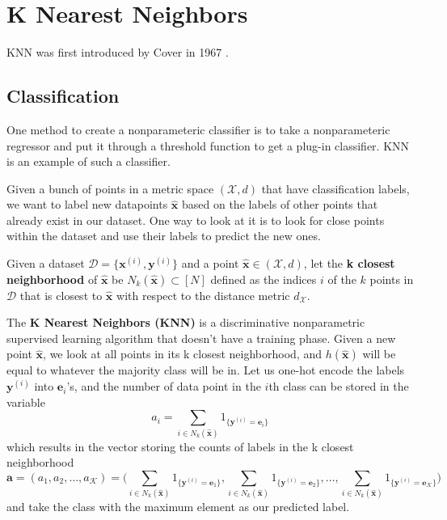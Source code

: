 \section{K Nearest Neighbors} 

  KNN was first introduced by Cover in 1967 \cite{1967cover}. 

\subsection{Classification} 

  One method to create a nonparameteric classifier is to take a nonparameteric regressor and put it through a threshold function to get a plug-in classifier. KNN is an example of such a classifier. 

  Given a bunch of points in a metric space $(\mathcal{X}, d)$ that have classification labels, we want to label new datapoints $\hat{\mathbf{x}}$ based on the labels of other points that already exist in our dataset. One way to look at it is to look for close points within the dataset and use their labels to predict the new ones. 

  \begin{definition}
    Given a dataset $\mathcal{D} = \{\mathbf{x}^{(i)}, \mathbf{y}^{(i)}\}$ and a point $\hat{\mathbf{x}} \in (\mathcal{X}, d)$, let the \textbf{k closest neighborhood} of $\hat{\mathbf{x}}$ be $N_k (\hat{\mathbf{x}}) \subset [N]$ defined as the indices $i$ of the $k$ points in $\mathcal{D}$ that is closest to $\hat{\mathbf{x}}$ with respect to the distance metric $d_\mathcal{X}$. 
  \end{definition}

  \begin{definition}
    The \textbf{K Nearest Neighbors (KNN)} is a discriminative nonparametric supervised learning algorithm that doesn't have a training phase. Given a new point $\hat{\mathbf{x}}$, we look at all points in its k closest neighborhood, and $h(\hat{\mathbf{x}})$ will be equal to whatever the majority class will be in. Let us one-hot encode the labels $\mathbf{y}^{(i)}$ into $\mathbf{e}_i$'s, and the number of data point in the $i$th class can be stored in the variable 
    \begin{equation}
      a_i = \sum_{i \in N_k (\hat{\mathbf{x}})} 1_{\{\mathbf{y}^{(i)} = \mathbf{e}_i\}}
    \end{equation}
    which results in the vector storing the counts of labels in the k closest neighborhood 
    \begin{equation}
      \mathbf{a} = (a_1, a_2, \ldots, a_\mathcal{K}) = \bigg( \sum_{i \in N_k (\hat{\mathbf{x}})} 1_{\{\mathbf{y}^{(i)} = \mathbf{e}_1\}}, \sum_{i \in N_k (\hat{\mathbf{x}})} 1_{\{\mathbf{y}^{(i)} = \mathbf{e}_2\}}, \ldots, \sum_{i \in N_k (\hat{\mathbf{x}})} 1_{\{\mathbf{y}^{(i)} = \mathbf{e}_\mathcal{K}\}} \bigg) 
    \end{equation}
    and take the class with the maximum element as our predicted label. 
  \end{definition}

